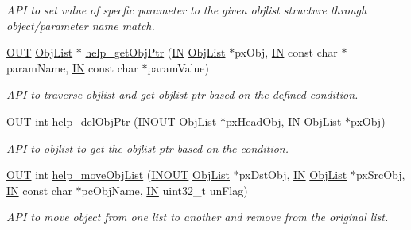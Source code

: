 \begin{DoxyCompactItemize}
\begin{DoxyCompactList}\small\item\em A\-P\-I to set value of specfic parameter to the given objlist structure through object/parameter name match. \end{DoxyCompactList}\item 
\hyperlink{group__LIBHELP_gaec78e7a9e90a406a56f859ee456e8eae}{O\-U\-T} \hyperlink{structObjList}{Obj\-List} $\ast$ \hyperlink{group__LIBHELP_ga97b4dc4de4d57f731e4dfa5547147d77}{help\-\_\-get\-Obj\-Ptr} (\hyperlink{group__LIBHELP_gac2bbd6d630a06a980d9a92ddb9a49928}{I\-N} \hyperlink{structObjList}{Obj\-List} $\ast$px\-Obj, \hyperlink{group__LIBHELP_gac2bbd6d630a06a980d9a92ddb9a49928}{I\-N} const char $\ast$param\-Name, \hyperlink{group__LIBHELP_gac2bbd6d630a06a980d9a92ddb9a49928}{I\-N} const char $\ast$param\-Value)
\begin{DoxyCompactList}\small\item\em A\-P\-I to traverse objlist and get objlist ptr based on the defined condition. \end{DoxyCompactList}\item 
\hyperlink{group__LIBHELP_gaec78e7a9e90a406a56f859ee456e8eae}{O\-U\-T} int \hyperlink{group__LIBHELP_ga4bd0e4017326296d0c6bf88e46f2e41a}{help\-\_\-del\-Obj\-Ptr} (\hyperlink{group__LIBHELP_ga62766f3ea8784d1db62df989f8f33d2d}{I\-N\-O\-U\-T} \hyperlink{structObjList}{Obj\-List} $\ast$px\-Head\-Obj, \hyperlink{group__LIBHELP_gac2bbd6d630a06a980d9a92ddb9a49928}{I\-N} \hyperlink{structObjList}{Obj\-List} $\ast$px\-Obj)
\begin{DoxyCompactList}\small\item\em A\-P\-I to objlist to get the objlist ptr based on the condition. \end{DoxyCompactList}\item 
\hyperlink{group__LIBHELP_gaec78e7a9e90a406a56f859ee456e8eae}{O\-U\-T} int \hyperlink{group__LIBHELP_ga3eeafa6790f449ab016121ea94074581}{help\-\_\-move\-Obj\-List} (\hyperlink{group__LIBHELP_ga62766f3ea8784d1db62df989f8f33d2d}{I\-N\-O\-U\-T} \hyperlink{structObjList}{Obj\-List} $\ast$px\-Dst\-Obj, \hyperlink{group__LIBHELP_gac2bbd6d630a06a980d9a92ddb9a49928}{I\-N} \hyperlink{structObjList}{Obj\-List} $\ast$px\-Src\-Obj, \hyperlink{group__LIBHELP_gac2bbd6d630a06a980d9a92ddb9a49928}{I\-N} const char $\ast$pc\-Obj\-Name, \hyperlink{group__LIBHELP_gac2bbd6d630a06a980d9a92ddb9a49928}{I\-N} uint32\-\_\-t un\-Flag)
\begin{DoxyCompactList}\small\item\em A\-P\-I to move object from one list to another and remove from the original list. \end{DoxyCompactList}\item 

\end{DoxyCompactItemize}
